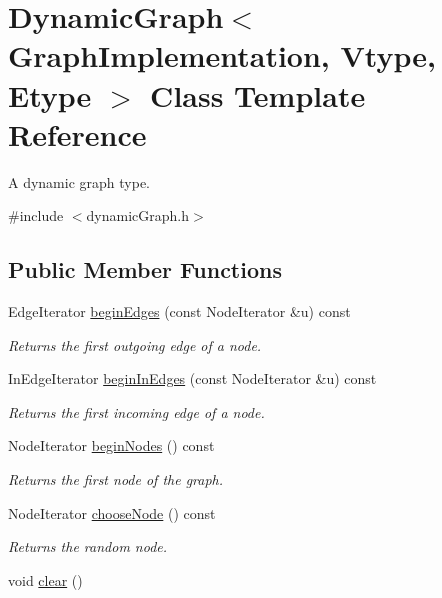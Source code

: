 \hypertarget{class_dynamic_graph}{
\section{DynamicGraph$<$ GraphImplementation, Vtype, Etype $>$ Class Template Reference}
\label{class_dynamic_graph}
}


A dynamic graph type.  




{\ttfamily \#include $<$dynamicGraph.h$>$}

\subsection*{Public Member Functions}
\begin{DoxyCompactItemize}
\item 
EdgeIterator \hyperlink{class_dynamic_graph_af82c60cd82a12a965679d38d410e33f0}{beginEdges} (const NodeIterator \&u) const 
\begin{DoxyCompactList}\small\item\em Returns the first outgoing edge of a node. \item\end{DoxyCompactList}\item 
InEdgeIterator \hyperlink{class_dynamic_graph_a56f09cd0f91aa2b35e28bbb3cd0568a4}{beginInEdges} (const NodeIterator \&u) const 
\begin{DoxyCompactList}\small\item\em Returns the first incoming edge of a node. \item\end{DoxyCompactList}\item 
NodeIterator \hyperlink{class_dynamic_graph_a4ca30c1f555cc535d47243562ffbc7ae}{beginNodes} () const 
\begin{DoxyCompactList}\small\item\em Returns the first node of the graph. \item\end{DoxyCompactList}\item 
NodeIterator \hyperlink{class_dynamic_graph_a38e3b1c0ba0d147fabffc3b8cbe0585b}{chooseNode} () const 
\begin{DoxyCompactList}\small\item\em Returns the random node. \item\end{DoxyCompactList}\item 
\hypertarget{class_dynamic_graph_a97b50b2b89d25dd548068818bef6fba3}{
void \hyperlink{class_dynamic_graph_a97b50b2b89d25dd548068818bef6fba3}{clear} ()}
\label{class_dynamic_graph_a97b50b2b89d25dd548068818bef6fba3}


\end{DoxyCompactItemize}
